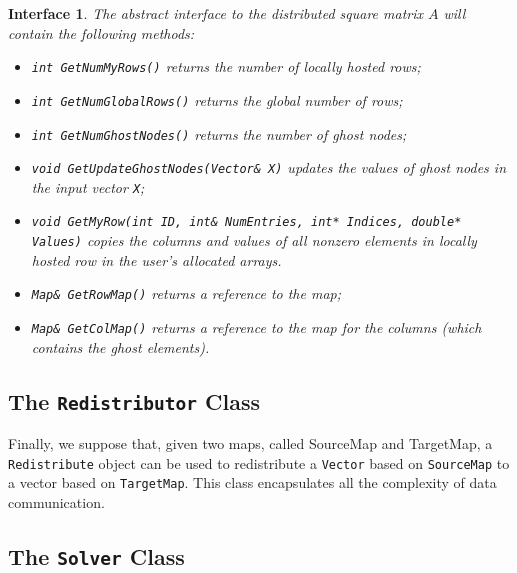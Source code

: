 \documentclass[acmtocl]{acmtrans2m}
\newtheorem{interface}{Interface}[section]
\begin{document}
\begin{interface}
\label{int:ami}
The abstract interface to the distributed square matrix $A$
will contain the following methods:
\begin{itemize}
\item \verb!int GetNumMyRows()! returns the number of locally hosted rows;
\item \verb!int GetNumGlobalRows()! returns the global number of rows;
\item \verb!int GetNumGhostNodes()! returns the number of ghost nodes;
\item \verb!void GetUpdateGhostNodes(Vector& X)! updates the values of ghost nodes
 in the input vector {\tt X};
\item {\tt void GetMyRow(int ID, int\& NumEntries, int* Indices, double*
                             Values)} copies the
columns and values of all nonzero elements in locally hosted row 
in the user's allocated arrays.
\item \verb!Map& GetRowMap()! returns a reference to the map;
\item \verb!Map& GetColMap()! returns a reference to the map for the columns
(which contains the ghost elements).
\end{itemize}
\end{interface}

\subsection{The {\tt Redistributor} Class}

Finally, we suppose that, given two maps, called SourceMap and TargetMap, a
{\tt Redistribute} object can be used to redistribute a {\tt Vector} based on
{\tt SourceMap} to a vector based on {\tt TargetMap}. This class encapsulates
all the complexity of data communication.

\subsection{The {\tt Solver} Class}
\label{sec:asi}
\end{document}
